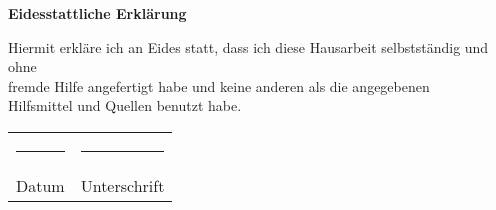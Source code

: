 \clearpage
\thispagestyle{empty}

\vfill

\begin{center}
    \LARGE\textbf{Eidesstattliche Erklärung}
\end{center}

\vspace{1.5cm}

\noindent
Hiermit erkläre ich an Eides statt, dass ich diese Hausarbeit selbstständig und ohne\\
fremde Hilfe angefertigt habe und keine anderen als die angegebenen\\
Hilfsmittel und Quellen benutzt habe.

\vspace{3cm}

\begin{tabular}{>{\centering\arraybackslash}p{7cm} >{\centering\arraybackslash}p{7cm}}
    \rule{7cm}{0.4pt} & \rule{7cm}{0.4pt} \\
    Datum & Unterschrift \\
\end{tabular}

\vfill

